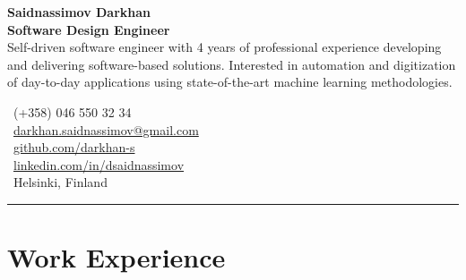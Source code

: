 \documentclass[a4paper,10pt]{article}
\begin{document}

\noindent
\begin{minipage}[t]{0.65\textwidth} %
    {\color{darkblue}\textbf{\LARGE Saidnassimov Darkhan}} \\[0.2cm]
    \textbf{\large Software Design Engineer} \\[0.2cm]
    Self-driven software engineer with 4 years of professional experience developing and delivering software-based solutions. Interested in automation and digitization of day-to-day applications using state-of-the-art machine learning methodologies.
\end{minipage}
\hfill
\begin{minipage}[t]{0.32\textwidth} %
    \vspace{0.5cm} %
    \raggedleft 
    \footnotesize %
    \faPhone\ (+358) 046 550 32 34 \\[0.2cm]
    \faEnvelope\ \href{mailto:darkhan.saidnassimov@gmail.com}{\mbox{darkhan.saidnassimov@gmail.com}} \\[0.2cm]
    \faGithub\ \href{https://github.com/darkhan-s}{\mbox{github.com/darkhan-s}} \\[0.2cm]
    \faLinkedin\ \href{https://www.linkedin.com/in/dsaidnassimov/}{\mbox{linkedin.com/in/dsaidnassimov}} \\[0.2cm]
    \faMapMarker\ Helsinki, Finland
\end{minipage}




\vspace{0.2cm}
\hrule
\vspace{0.1cm}

\section*{Work Experience}
\end{document}

